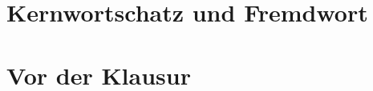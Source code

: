 \documentclass[handout,aspectratio=1610,dvipsnames]{beamer}
\begin{document}
  \section[Kernwortschatz]{Kernwortschatz und Fremdwort}
  \let\woopsi\section\let\section\subsection\let\subsection\subsubsection
  
  \let\subsection\section\let\section\woopsi

  \section{Vor der Klausur}
\end{document}

